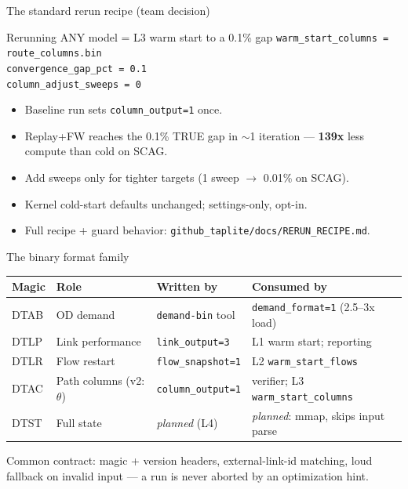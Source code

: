 \documentclass[10pt]{beamer}
\newcommand{\code}[1]{\texttt{#1}}
\begin{document}
\begin{frame}{The standard rerun recipe (team decision)}
  \begin{block}{Rerunning ANY model = L3 warm start to a 0.1\% gap}
    \code{warm\_start\_columns = route\_columns.bin}\\
    \code{convergence\_gap\_pct = 0.1}\\
    \code{column\_adjust\_sweeps = 0}
  \end{block}
  \begin{itemize}
    \item Baseline run sets \code{column\_output=1} once.
    \item Replay+FW reaches the 0.1\% TRUE gap in $\sim$1 iteration ---
      \textbf{139x} less compute than cold on SCAG.
    \item Add sweeps only for tighter targets (1 sweep $\to$ 0.01\% on SCAG).
    \item Kernel cold-start defaults unchanged; settings-only, opt-in.
    \item Full recipe + guard behavior:
      \code{github\_taplite/docs/RERUN\_RECIPE.md}.
  \end{itemize}
\end{frame}

\begin{frame}{The binary format family}
  \begin{table}
  \centering
  \small
  \begin{tabular}{llll}
    \toprule
    Magic & Role & Written by & Consumed by \\
    \midrule
    DTAB & OD demand & \code{demand-bin} tool & \code{demand\_format=1}
      (2.5--3x load) \\
    DTLP & Link performance & \code{link\_output=3} & L1 warm start; reporting \\
    DTLR & Flow restart & \code{flow\_snapshot=1} & L2
      \code{warm\_start\_flows} \\
    DTAC & Path columns (v2: $\theta$) & \code{column\_output=1} & verifier;
      L3 \code{warm\_start\_columns} \\
    DTST & Full state & \emph{planned} (L4) & \emph{planned}: mmap, skips
      input parse \\
    \bottomrule
  \end{tabular}
  \end{table}
  \medskip
  Common contract: magic + version headers, external-link-id matching,
  loud fallback on invalid input --- a run is never aborted by an
  optimization hint.
\end{frame}
\end{document}
